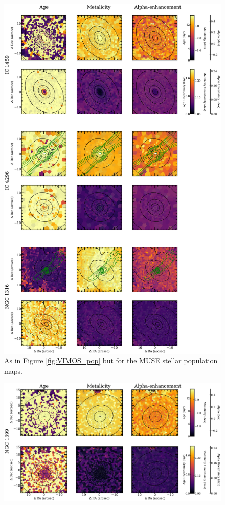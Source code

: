		\begin{figure}
			\centering
			\includegraphics[height=0.94\textheight]{chapter4/muse/pop1.png}
			\caption[MUSE stellar population maps]{As in Figure \ref{fig:VIMOS_pop} but for the MUSE stellar population maps.}
			\label{fig:MUSE_pop}
		\end{figure}
		\begin{figure}
			\centering
			\includegraphics[height=0.31\textheight]{chapter4/muse/pop2.png}
		\end{figure}



